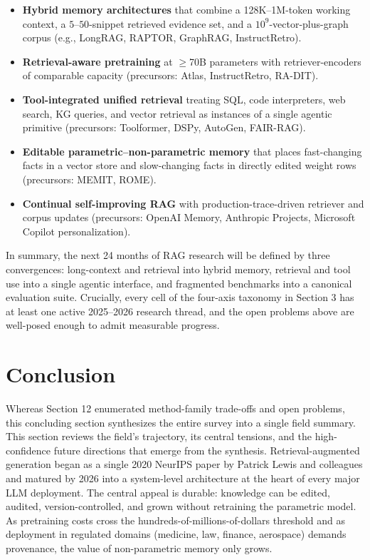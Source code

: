 \documentclass{article}
\begin{document}
\begin{itemize}

\item
  \textbf{Hybrid memory architectures} that combine a 128K--1M-token working context, a \(5\)--\(50\)-snippet retrieved evidence set, and a \(10^9\)-vector-plus-graph corpus (e.g., LongRAG, RAPTOR, GraphRAG, InstructRetro).
\item
  \textbf{Retrieval-aware pretraining} at $\geq$70B parameters with retriever-encoders of comparable capacity (precursors: Atlas, InstructRetro, RA-DIT).
\item
  \textbf{Tool-integrated unified retrieval} treating SQL, code interpreters, web search, KG queries, and vector retrieval as instances of a single agentic primitive (precursors: Toolformer, DSPy, AutoGen, FAIR-RAG).
\item
  \textbf{Editable parametric--non-parametric memory} that places fast-changing facts in a vector store and slow-changing facts in directly edited weight rows (precursors: MEMIT, ROME).
\item
  \textbf{Continual self-improving RAG} with production-trace-driven retriever and corpus updates (precursors: OpenAI Memory, Anthropic Projects, Microsoft Copilot personalization).
\end{itemize}

In summary, the next 24 months of RAG research will be defined by three convergences: long-context and retrieval into hybrid memory, retrieval and tool use into a single agentic interface, and fragmented benchmarks into a canonical evaluation suite. Crucially, every cell of the four-axis taxonomy in Section 3 has at least one active 2025--2026 research thread, and the open problems above are well-posed enough to admit measurable progress.

\section{Conclusion}\label{conclusion}

Whereas Section 12 enumerated method-family trade-offs and open problems, this concluding section synthesizes the entire survey into a single field summary. This section reviews the field's trajectory, its central tensions, and the high-confidence future directions that emerge from the synthesis. Retrieval-augmented generation began as a single 2020 NeurIPS paper by Patrick Lewis and colleagues and matured by 2026 into a system-level architecture at the heart of every major LLM deployment. The central appeal is durable: knowledge can be edited, audited, version-controlled, and grown without retraining the parametric model. As pretraining costs cross the hundreds-of-millions-of-dollars threshold and as deployment in regulated domains (medicine, law, finance, aerospace) demands provenance, the value of non-parametric memory only grows.
\end{document}
